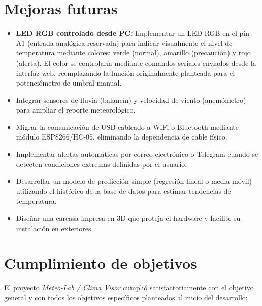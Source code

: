 \section{Mejoras futuras}

\begin{itemize}[leftmargin=*]
    \item \textbf{LED RGB controlado desde PC:} Implementar un LED RGB en el pin A1 (entrada analógica reservada) para indicar visualmente el nivel de temperatura mediante colores: verde (normal), amarillo (precaución) y rojo (alerta). El color se controlaría mediante comandos seriales enviados desde la interfaz web, reemplazando la función originalmente planteada para el potenciómetro de umbral manual.
    \item Integrar sensores de lluvia (balancín) y velocidad de viento (anemómetro) para ampliar el reporte meteorológico.
    \item Migrar la comunicación de USB cableado a WiFi o Bluetooth mediante módulo ESP8266/HC-05, eliminando la dependencia de cable físico.
    \item Implementar alertas automáticas por correo electrónico o Telegram cuando se detecten condiciones extremas definidas por el usuario.
    \item Desarrollar un modelo de predicción simple (regresión lineal o media móvil) utilizando el histórico de la base de datos para estimar tendencias de temperatura.
    \item Diseñar una carcasa impresa en 3D que proteja el hardware y facilite su instalación en exteriores.
\end{itemize}

\label{ch:conclusiones}

\section{Cumplimiento de objetivos}

El proyecto \textit{Meteo-Lab / Clima Visor} cumplió satisfactoriamente con el objetivo general y con todos los objetivos específicos planteados al inicio del desarrollo:

